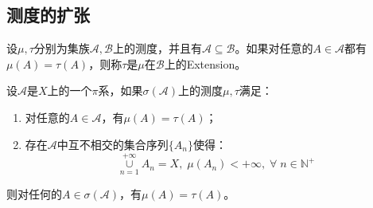 \subsection{测度的扩张}
\begin{definition}
	设$\mu,\tau$分别为集族$\mathscr{A},\mathscr{B}$上的测度，并且有$\mathscr{A}\subseteq\mathscr{B}$。如果对任意的$A\in\mathscr{A}$都有$\mu(A)=\tau(A)$，则称$\tau$是$\mu$在$\mathscr{B}$上的\gls{Extension}。
\end{definition}
\begin{lemma}\label{lem:PiExtensionMeasure}
	设$\mathscr{A}$是$X$上的一个$\pi$系，如果$\sigma(\mathscr{A})$上的测度$\mu,\tau$满足：
	\begin{enumerate}
		\item 对任意的$A\in\mathscr{A}$，有$\mu(A)=\tau(A)$；
		\item 存在$\mathscr{A}$中互不相交的集合序列$\{A_n\}$使得：
		\begin{equation*}
			\underset{n=1}{\overset{+\infty}{\cup}}A_n=X,\;\mu(A_n)<+\infty,\;\forall\;n\in\mathbb{N}^+
		\end{equation*}
	\end{enumerate}
	则对任何的$A\in\sigma(\mathscr{A})$，有$\mu(A)=\tau(A)$。
\end{lemma}
